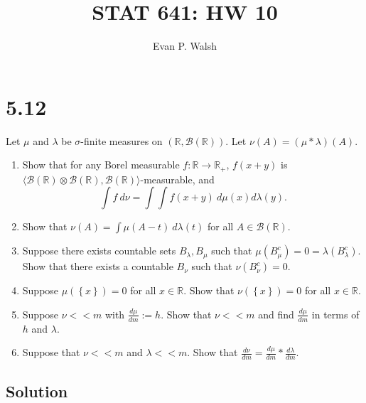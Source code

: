 \documentclass[12pt]{article}
\title{STAT 641: HW 10}
\author{Evan P. Walsh}
\begin{document}

\section*{5.12}
Let $\mu$ and $\lambda$ be $\sigma$-finite measures on $(\mathbb{R}, \mathcal{B}(\mathbb{R}))$. Let $\nu(A) = (\mu * \lambda)(A)$.
\begin{enumerate}[label=(\alph*)]
\item Show that for any Borel measurable $f : \mathbb{R} \rightarrow \mathbb{R}_{+}$, $f(x + y)$ is $\langle\mathcal{B}(\mathbb{R})\otimes
\mathcal{B}(\mathbb{R}), \mathcal{B}(\mathbb{R})\rangle$-measurable, and 
\[ \int f\ d\nu = \int \int f(x + y)\ d\mu(x) d\lambda(y). \]
\item Show that $\nu(A) = \int \mu(A - t)\ d\lambda(t)$ for all $A \in \mathcal{B}(\mathbb{R})$.
\item Suppose there exists countable sets $B_{\lambda}, B_{\mu}$ such that $\mu(B_{\mu}^{c}) = 0 = \lambda(B_{\lambda}^{c})$. Show that there exists a
countable $B_{\nu}$ such that $\nu(B_{\nu}^{c}) = 0$.
\item Suppose $\mu\left( \left\{ x \right\} \right) = 0$ for all $x \in \mathbb{R}$. Show that $\nu\left( \left\{ x \right\} \right) = 0$ for all $x
\in \mathbb{R}$.
\item Suppose $\nu << m$ with $\frac{d\mu}{dm} := h$. Show that $\nu << m$ and find $\frac{d\mu}{dm}$ in terms of $h$ and $\lambda$.
\item Suppose that $\nu << m$ and $\lambda << m$. Show that $\frac{d\nu}{dm} = \frac{d\mu}{dm}*\frac{d\lambda}{dm}$. 
\end{enumerate}

\subsection*{Solution}
\end{document}
